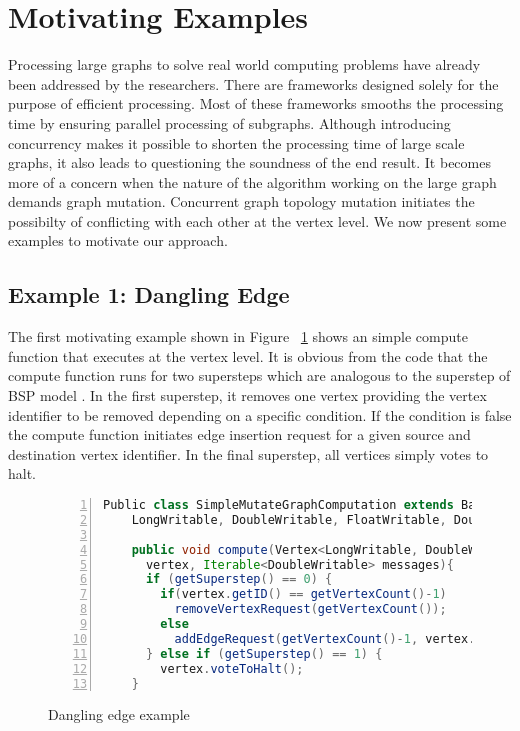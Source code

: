 \section{Motivating Examples}
\label{sec:motivation}

Processing large graphs to solve real world computing problems have already been addressed by the researchers. There are frameworks designed solely for the purpose of efficient processing. Most of these frameworks smooths the processing time by ensuring parallel processing of subgraphs. Although introducing concurrency makes it possible to shorten the processing time of large scale graphs, it also leads to questioning the soundness of the end result. It becomes more of a concern when the nature of the algorithm working on the large graph demands graph mutation. Concurrent graph topology mutation initiates the possibilty of conflicting with each other at the vertex level. We now present some examples to motivate our approach.


\subsection{Example 1: Dangling Edge}
\label{subsec:example1}

The first motivating example shown in Figure ~\ref{fig:dEdge} shows an simple compute function that executes at the vertex level. It is obvious from the code that the compute function runs for two supersteps which are analogous to the superstep of BSP model \cite{Valiant1990}. In the first superstep, it removes one vertex providing the vertex identifier to be removed depending on a specific condition. If the condition is false the compute function initiates edge insertion request for a given source and destination vertex identifier. In the final superstep, all vertices simply votes to halt.

\begin{figure}[h]
\begin{center}
\begin{lstlisting}[frame=tb, keywordstyle=\color{blue}, backgroundcolor=\color{white}, basicstyle=\footnotesize\ttfamily, language=Java, numbers=left, numberstyle=\tiny\color{black}]
  Public class SimpleMutateGraphComputation extends BasicComputation<
    LongWritable, DoubleWritable, FloatWritable, DoubleWritable> {

    public void compute(Vertex<LongWritable, DoubleWritable, FloatWritable>
      vertex, Iterable<DoubleWritable> messages){
      if (getSuperstep() == 0) {
        if(vertex.getID() == getVertexCount()-1)
          removeVertexRequest(getVertexCount());
        else
          addEdgeRequest(getVertexCount()-1, vertex.getID());
      } else if (getSuperstep() == 1) {
        vertex.voteToHalt();
    }
\end{lstlisting}
\end{center}
\caption{Dangling edge example}
\label{fig:dEdge}
\end{figure}


